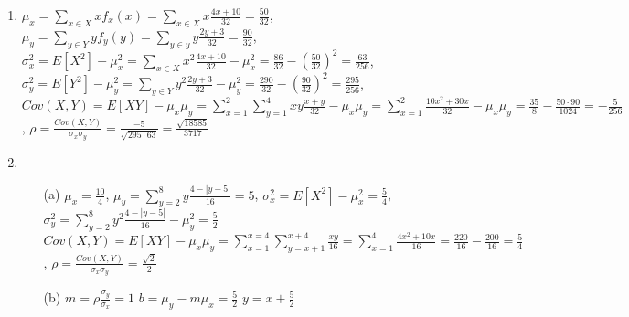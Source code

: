 \documentclass{article}
\begin{document}
\begin{enumerate}[label=\textbf{Problem \arabic*.}]
        \item $\displaystyle \mu_x=\sum_{x\in X}x f_x(x)=\sum_{x\in X}x \frac{4x+10}{32}=\frac{50}{32}$, $\displaystyle \mu_y=\sum_{y\in Y}y f_y(y)=\sum_{y\in y}y \frac{2y+3}{32}=\frac{90}{32}$, 
        $\displaystyle \sigma_x^2=E[X^2]-\mu_x^2=\sum_{x\in X}x^2 \frac{4x+10}{32}-\mu_x^2=\frac{86}{32}-{(\frac{50}{32})}^2=\frac{63}{256}$, $\displaystyle \sigma_y^2=E[Y^2]-\mu_y^2=\sum_{y\in Y}y^2 \frac{2y+3}{32}-\mu_y^2=\frac{290}{32}-{(\frac{90}{32})}^2=\frac{295}{256}$, 
        $\displaystyle Cov(X,Y)=E[XY]-\mu_x\mu_y=\sum_{x=1}^{2}\sum_{y=1}^{4}xy\frac{x+y}{32}-\mu_x\mu_y=\sum_{x=1}^{2}\frac{10x^2+30x}{32}-\mu_x\mu_y=\frac{35}{8}-\frac{50\cdot90}{1024}=-\frac{5}{256}$, 
        $\rho=\frac{Cov(X,Y)}{\sigma_x\sigma_y}=\frac{-5}{\sqrt{295\cdot63}}=\frac{\sqrt{18585}}{3717}$ 
        \item \begin{itemize}
            \item [(a)] $\mu_x=\frac{10}{4}$, $\mu_y=\sum_{y=2}^{8}y\frac{4-|y-5|}{16}=5$, $\sigma_x^2=E[X^2]-\mu_x^2=\frac{5}{4}$, $\sigma_y^2=\sum_{y=2}^{8}y^2\frac{4-|y-5|}{16}-\mu_y^2=\frac{5}{2}$ $\displaystyle Cov(X,Y)=E[XY]-\mu_x\mu_y=\sum_{x=1}^{x=4}\sum_{y=x+1}^{x+4}\frac{xy}{16}=\sum_{x=1}^{4}\frac{4x^2+10x}{16}=\frac{220}{16}-\frac{200}{16}=\frac{5}{4}$, $\rho=\frac{Cov(X,Y)}{\sigma_x\sigma_y}=\frac{\sqrt{2}}{2}$
            \item [(b)] $m=\rho\frac{\sigma_y}{\sigma_x}=1$ $b=\mu_y-m\mu_x=\frac{5}{2}$ $y=x+\frac{5}{2}$
        \end{itemize}
\end{enumerate}
\end{document}
